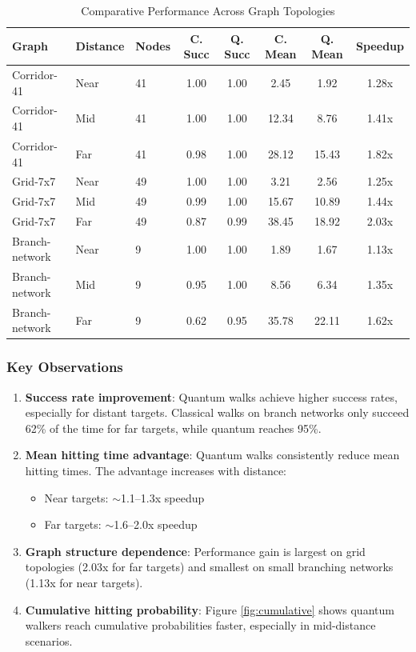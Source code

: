 \documentclass[12pt,a4paper]{article}
\begin{document}
\begin{table}[H]
\centering
\caption{Comparative Performance Across Graph Topologies}
\begin{tabular}{lllccccc}
\toprule
\textbf{Graph} & \textbf{Distance} & \textbf{Nodes} & \textbf{C. Succ} & \textbf{Q. Succ} & \textbf{C. Mean} & \textbf{Q. Mean} & \textbf{Speedup} \\
\midrule
Corridor-41 & Near & 41 & 1.00 & 1.00 & 2.45 & 1.92 & 1.28x \\
Corridor-41 & Mid & 41 & 1.00 & 1.00 & 12.34 & 8.76 & 1.41x \\
Corridor-41 & Far & 41 & 0.98 & 1.00 & 28.12 & 15.43 & 1.82x \\
\midrule
Grid-7x7 & Near & 49 & 1.00 & 1.00 & 3.21 & 2.56 & 1.25x \\
Grid-7x7 & Mid & 49 & 0.99 & 1.00 & 15.67 & 10.89 & 1.44x \\
Grid-7x7 & Far & 49 & 0.87 & 0.99 & 38.45 & 18.92 & 2.03x \\
\midrule
Branch-network & Near & 9 & 1.00 & 1.00 & 1.89 & 1.67 & 1.13x \\
Branch-network & Mid & 9 & 0.95 & 1.00 & 8.56 & 6.34 & 1.35x \\
Branch-network & Far & 9 & 0.62 & 0.95 & 35.78 & 22.11 & 1.62x \\
\bottomrule
\end{tabular}
\end{table}

\subsubsection{Key Observations}

\begin{enumerate}
    \item \textbf{Success rate improvement}: Quantum walks achieve higher success rates, especially for distant targets. Classical walks on branch networks only succeed 62\% of the time for far targets, while quantum reaches 95\%.
    
    \item \textbf{Mean hitting time advantage}: Quantum walks consistently reduce mean hitting times. The advantage increases with distance:
    \begin{itemize}
        \item Near targets: $\sim$1.1--1.3x speedup
        \item Far targets: $\sim$1.6--2.0x speedup
    \end{itemize}
    
    \item \textbf{Graph structure dependence}: Performance gain is largest on grid topologies (2.03x for far targets) and smallest on small branching networks (1.13x for near targets).
    
    \item \textbf{Cumulative hitting probability}: Figure \ref{fig:cumulative} shows quantum walkers reach cumulative probabilities faster, especially in mid-distance scenarios.
\end{enumerate}
\end{document}
